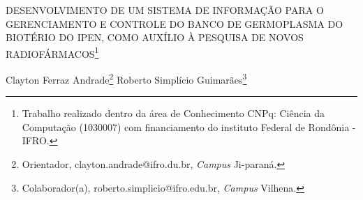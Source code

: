 \documentclass[article,12pt,onesidea,4paper,english,brazil]{abntex2}
\begin{document}
	
	
	\frenchspacing 
	
	\begin{center}
		\LARGE DESENVOLVIMENTO DE UM SISTEMA DE INFORMAÇÃO PARA O
		GERENCIAMENTO E CONTROLE DO BANCO DE GERMOPLASMA DO BIOTÉRIO DO IPEN, COMO AUXÍLIO À PESQUISA DE NOVOS RADIOFÁRMACOS\footnote{Trabalho realizado dentro da área de Conhecimento CNPq: Ciência da Computação (1030007) com financiamento do instituto Federal de Rondônia - IFRO.}
		
		\normalsize
		Clayton Ferraz Andrade\footnote{Orientador, clayton.andrade@ifro.du.br, \textit{Campus} Ji-paraná.} 
		Roberto Simplício Guimarães\footnote{Colaborador(a), roberto.simplicio@ifro.edu.br, \textit{Campus} Vilhena.} 
	\end{center}
	
\end{document}

